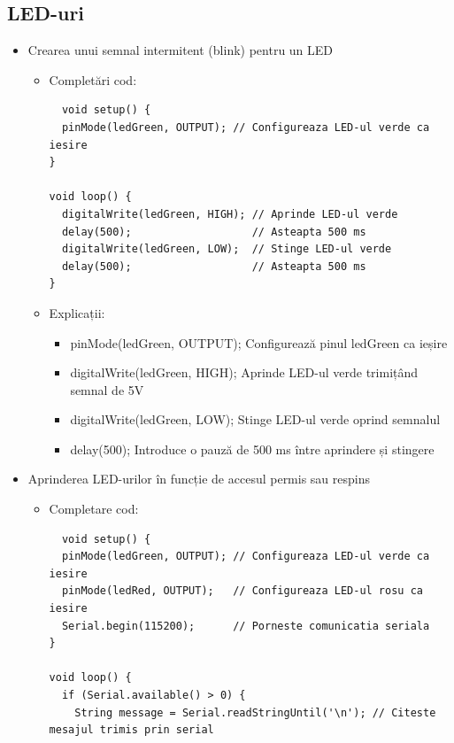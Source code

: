 \documentclass{report}
\begin{document}
\subsection{LED-uri}
\begin{itemize}
    \item  Crearea unui semnal intermitent (blink) pentru un LED
    \begin{itemize}
        \item Completări cod:
            \begin{lstlisting}
  void setup() {
  pinMode(ledGreen, OUTPUT); // Configureaza LED-ul verde ca iesire
}

void loop() {
  digitalWrite(ledGreen, HIGH); // Aprinde LED-ul verde
  delay(500);                   // Asteapta 500 ms
  digitalWrite(ledGreen, LOW);  // Stinge LED-ul verde
  delay(500);                   // Asteapta 500 ms
}

            \end{lstlisting}
            \newpage 
            \vspace*{1cm}
            \item Explicații: 
                \begin{itemize}
                    \item pinMode(ledGreen, OUTPUT);   Configurează pinul ledGreen ca ieșire
                    \item digitalWrite(ledGreen, HIGH);   Aprinde LED-ul verde trimițând semnal de 5V
                    \item digitalWrite(ledGreen, LOW);   Stinge LED-ul verde oprind semnalul
                    \item delay(500);   Introduce o pauză de 500 ms între aprindere și stingere
                \end{itemize}
    \end{itemize}
    \item Aprinderea LED-urilor în funcție de accesul permis sau respins
    \begin{itemize}
        \item Completare cod:
            \begin{lstlisting}
  void setup() {
  pinMode(ledGreen, OUTPUT); // Configureaza LED-ul verde ca iesire
  pinMode(ledRed, OUTPUT);   // Configureaza LED-ul rosu ca iesire
  Serial.begin(115200);      // Porneste comunicatia seriala
}

void loop() {
  if (Serial.available() > 0) {
    String message = Serial.readStringUntil('\n'); // Citeste mesajul trimis prin serial


\end{lstlisting}
\end{itemize}
\end{itemize}
\end{document}
